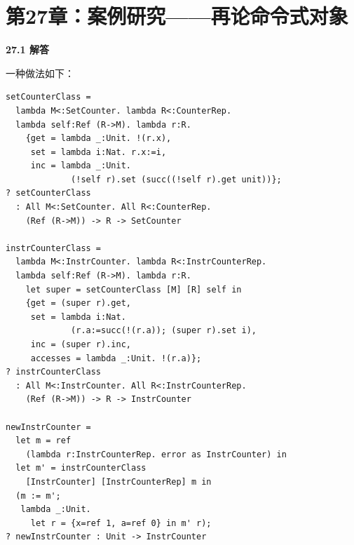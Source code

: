 \newpage
\section{第27章：案例研究——再论命令式对象}

\begin{taplauthorsolutionentrybox}
\label{sol:author:27.1}
\textbf{27.1 解答}

一种做法如下：
\begin{lstlisting}
setCounterClass =
  lambda M<:SetCounter. lambda R<:CounterRep.
  lambda self:Ref (R->M). lambda r:R.
    {get = lambda _:Unit. !(r.x),
     set = lambda i:Nat. r.x:=i,
     inc = lambda _:Unit.
             (!self r).set (succ((!self r).get unit))};
? setCounterClass
  : All M<:SetCounter. All R<:CounterRep.
    (Ref (R->M)) -> R -> SetCounter

instrCounterClass =
  lambda M<:InstrCounter. lambda R<:InstrCounterRep.
  lambda self:Ref (R->M). lambda r:R.
    let super = setCounterClass [M] [R] self in
    {get = (super r).get,
     set = lambda i:Nat.
             (r.a:=succ(!(r.a)); (super r).set i),
     inc = (super r).inc,
     accesses = lambda _:Unit. !(r.a)};
? instrCounterClass
  : All M<:InstrCounter. All R<:InstrCounterRep.
    (Ref (R->M)) -> R -> InstrCounter

newInstrCounter =
  let m = ref
    (lambda r:InstrCounterRep. error as InstrCounter) in
  let m' = instrCounterClass
    [InstrCounter] [InstrCounterRep] m in
  (m := m';
   lambda _:Unit.
     let r = {x=ref 1, a=ref 0} in m' r);
? newInstrCounter : Unit -> InstrCounter
\end{lstlisting}
\end{taplauthorsolutionentrybox}
